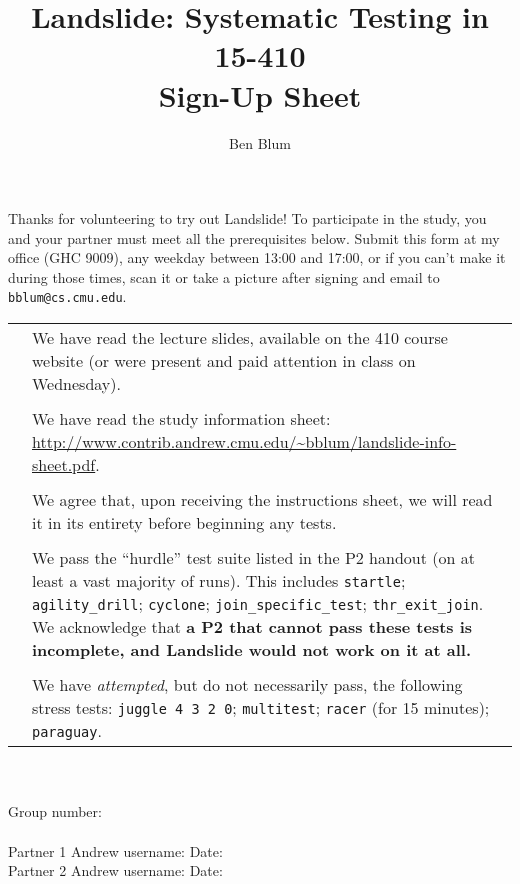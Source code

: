 \documentclass{article}
\begin{document}

\newcommand\checkbox[1]{\huge \Square & #1 \\}

\title{\bf Landslide: Systematic Testing in 15-410 \\ Sign-Up Sheet}
\author{Ben Blum}
\date{}
\maketitle

Thanks for volunteering to try out Landslide! To participate in the study, you and your partner must meet all the prerequisites below. Submit this form at my office (GHC 9009), any weekday between 13:00 and 17:00, or if you can't make it during those times, scan it or take a picture after signing and email to {\tt bblum@cs.cmu.edu}.
\\

\begin{tabular}{lp{5.5in}}
	\checkbox{We have read the lecture slides, available on the 410 course website (or were present and paid attention in class on Wednesday).}

	\\
	\checkbox{We have read the study information sheet: \url{http://www.contrib.andrew.cmu.edu/~bblum/landslide-info-sheet.pdf}.}

	\\
	\checkbox{We agree that, upon receiving the instructions sheet, we will read it in its entirety before beginning any tests.}

	\\
	\checkbox{We pass the ``hurdle'' test suite listed in the P2 handout (on at least a vast majority of runs). This includes {\tt startle}; {\tt agility\_drill}; {\tt cyclone}; {\tt join\_specific\_test}; {\tt thr\_exit\_join}. We acknowledge that {\bf a P2 that cannot pass these tests is incomplete, and Landslide would not work on it at all.}}

	\\
	\checkbox{We have {\em attempted}, but do not necessarily pass, the following stress tests: {\tt juggle 4 3 2 0}; {\tt multitest}; {\tt racer} (for 15 minutes); {\tt paraguay}.}


\end{tabular}
\\
\vspace{0.5in}
\\
Group number: \underline{\hspace{1.5in}}\\
\vspace{0.5in}\\
Partner 1 Andrew username: \underline{\hspace{2.5in}} Date: \underline{\hspace{1.5in}}
\vspace{0.5in}\\
Partner 2 Andrew username: \underline{\hspace{2.5in}} Date: \underline{\hspace{1.5in}}
\end{document}
